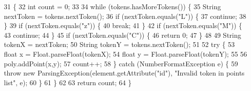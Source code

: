 \begin{DoxyCode}
31                                                                                                            
             \{
32         \textcolor{keywordtype}{int} count = 0;
33         
34         \textcolor{keywordflow}{while} (tokens.hasMoreTokens()) \{
35             String nextToken = tokens.nextToken();
36             \textcolor{keywordflow}{if} (nextToken.equals(\textcolor{stringliteral}{"L"})) \{
37                 \textcolor{keywordflow}{continue};
38             \}
39             \textcolor{keywordflow}{if} (nextToken.equals(\textcolor{stringliteral}{"z"})) \{
40                 \textcolor{keywordflow}{break};
41             \}
42             \textcolor{keywordflow}{if} (nextToken.equals(\textcolor{stringliteral}{"M"})) \{
43                 \textcolor{keywordflow}{continue};
44             \}
45             \textcolor{keywordflow}{if} (nextToken.equals(\textcolor{stringliteral}{"C"})) \{
46                 \textcolor{keywordflow}{return} 0;
47             \}
48             
49             String tokenX = nextToken;
50             String tokenY = tokens.nextToken();
51             
52             \textcolor{keywordflow}{try} \{
53                 \textcolor{keywordtype}{float} x = Float.parseFloat(tokenX);
54                 \textcolor{keywordtype}{float} y = Float.parseFloat(tokenY);
55                 
56                 poly.addPoint(x,y);
57                 count++;
58             \} \textcolor{keywordflow}{catch} (NumberFormatException e) \{
59                 \textcolor{keywordflow}{throw} \textcolor{keyword}{new} ParsingException(element.getAttribute(\textcolor{stringliteral}{"id"}), \textcolor{stringliteral}{"Invalid token in points list"}, e);
60             \}
61         \}
62         
63         \textcolor{keywordflow}{return} count;
64     \}
\end{DoxyCode}
